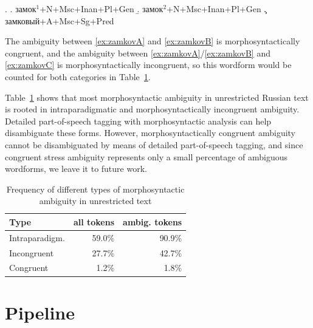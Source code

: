 \documentclass[11pt]{article}
\newcommand{\rus}[1]{\foreignlanguage{russian}{#1}}
\begin{document}
\ex. \label{ex:zamkov}
	 \a. \rus{замок}$^1$+N+Msc+Inan+Pl+Gen \label{ex:zamkovA}
	 \b. \rus{замок}$^2$+N+Msc+Inan+Pl+Gen \label{ex:zamkovB}
	 \c. \rus{замковый}+A+Msc+Sg+Pred      \label{ex:zamkovC}

The ambiguity between \ref{ex:zamkovA} and \ref{ex:zamkovB} is morphosyntactically congruent, and
the ambiguity between \ref{ex:zamkovA}/\ref{ex:zamkovB} and \ref{ex:zamkovC} is
morphosyntactically incongruent, so this wordform would be counted for both categories in
Table~\ref{table:ambiguity}.

Table~\ref{table:ambiguity} shows that most morphosyntactic ambiguity in 
unrestricted Russian text is rooted in intraparadigmatic and morphosyntactically 
incongruent ambiguity. Detailed part-of-speech tagging with morphosyntactic 
analysis can help disambiguate these forms. However, morphosyntactically congruent
ambiguity cannot be disambiguated by means of detailed part-of-speech tagging, 
and since congruent stress ambiguity represents only a small percentage of 
ambiguous wordforms, we leave it to future work.

\begin{table}[ht]
  \centering
  \begin{tabular}{l|rr}
    \hline
    \textbf{Type}  & \textbf{all tokens} & \textbf{ambig. tokens} \\
    \hline
    Intraparadigm. & 59.0\%                   & 90.9\%   \\
    Incongruent    & 27.7\%                   & 42.7\%   \\ 
    Congruent      & 1.2\%                   & 1.8\%    \\ 
    \hline
  \end{tabular}
  \caption{Frequency of different types of morphosyntactic ambiguity in unrestricted text}
  \label{table:ambiguity}
\end{table}



\section{Pipeline}
\label{sec:pipeline}
\end{document}

